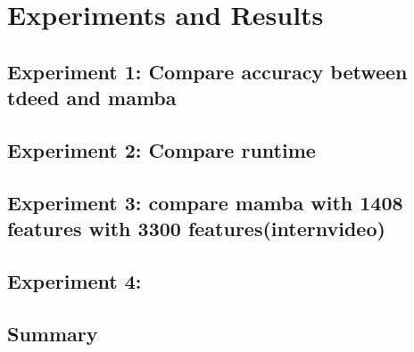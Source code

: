 \chapter{Experiments and Results}
\label{chap:experiments}

\section{Experiment 1: Compare accuracy between tdeed and mamba}
\section{Experiment 2: Compare runtime}
\section{Experiment 3: compare mamba with 1408 features with 3300 features(internvideo) }
\section{Experiment 4: }
\section{Summary}